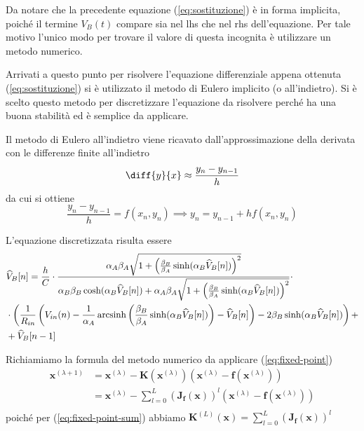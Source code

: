 	Da notare che la precedente equazione (\ref{eq:sostituzione}) è in forma implicita, poiché il termine $V_{B}(t)$ compare sia nel lhs che nel rhs dell'equazione. Per tale motivo l'unico modo per trovare il valore di questa incognita è utilizzare un metodo numerico.
	
	Arrivati a questo punto per risolvere l'equazione differenziale appena ottenuta (\ref{eq:sostituzione}) si è utilizzato il metodo di Eulero implicito (o all'indietro). Si è scelto questo metodo per discretizzare l'equazione da risolvere perché ha una buona stabilità ed è semplice da applicare.
	
	Il metodo di Eulero all'indietro viene ricavato dall'approssimazione della derivata con le differenze finite all'indietro
	\[
		\diff{y}{x} \approx \frac{y_{n}-y_{n-1}}{h}
	\]
	da cui si ottiene
	\[
		\frac{y_{n}-y_{n-1}}{h} = f(x_{n},y_{n}) \implies y_{n} = y_{n-1}+hf(x_{n},y_{n})
	\]
	
	L'equazione discretizzata risulta essere
	\begin{equation}
		\label{eq:discretizzazione}
		\begin{split}
			&\widehat V_{B}[n] = \frac{h}{C}\cdot\frac{\alpha_{A}\beta_{A}\sqrt{1+\left(\frac{\beta_{B}}{\beta_{A}}\sinh(\alpha_{B}\widehat V_{B}[n])\right)^{2}}}{\alpha_{B}\beta_{B}\cosh(\alpha_{B}\widehat V_{B}[n])+\alpha_{A}\beta_{A}\sqrt{1+\left(\frac{\beta_{B}}{\beta_{A}}\sinh(\alpha_{B}\widehat V_{B}[n])\right)^{2}}}\cdot\\&\cdot\left(\frac{1}{R_{in}}\left(V_{in}(n)-\frac{1}{\alpha_{A}} \operatorname{arcsinh} \left(\frac{\beta_{B}}{\beta_{A}} \sinh(\alpha_{B}\widehat V_{B}[n])\right)-\widehat V_{B}[n]\right)-2\beta_{B}\sinh(\alpha_{B}\widehat V_{B}[n])\right)+\\&+\widehat V_{B}[n-1]\\
		\end{split}
	\end{equation}
	\pagebreak
	
	Richiamiamo la formula del metodo numerico da applicare (\ref{eq:fixed-point})
	\begin{equation}
		\label{eq:punto_fisso1}
		\begin{split}
			\mathbf{x}^{(\lambda+1)} &= \mathbf{x}^{(\lambda)}-\mathbf{K}(\mathbf{x}^{(\lambda)})(\mathbf{x}^{(\lambda)}-\mathbf{f}(\mathbf{x}^{(\lambda)}))\\
			&= \mathbf{x}^{(\lambda)}-\sum_{l=0}^{L} \left(\mathbf{J_{f}(x)}\right)^{l}(\mathbf{x}^{(\lambda)}-\mathbf{f}(\mathbf{x}^{(\lambda)}))\\
		\end{split}
	\end{equation}
	poiché per (\ref{eq:fixed-point-sum}) abbiamo $\mathbf{K}^{(L)}(\mathbf{x}) = \sum_{l=0}^{L} \left(\mathbf{J_{f}(x)}\right)^{l}$\\
	

